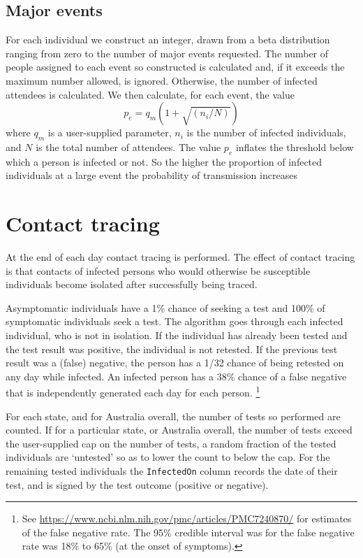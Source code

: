 \documentclass[submission]{grattan}
\newcommand*{\code}[1]{\texttt{#1}}
\begin{document}
\subsection{Major events}
For each individual we construct an integer, drawn from a beta distribution ranging from zero
to the number of major events requested. The number of people assigned to each event so constructed
is calculated and, if it exceeds the maximum number allowed, is ignored. Otherwise, the number of
infected attendees is calculated. We then calculate, for each event, the value
\[p_e = q_m(1 + \sqrt{(n_i / N)}) \]
where \(q_m\) is a user-supplied parameter, \(n_i\) is the number of infected individuals, and \(N\)
is the total number of attendees. The value \(p_e\) inflates the threshold below which a person is infected
or not. So the higher the proportion of infected individuals at a large event the probability of 
transmission increases 

\section{Contact tracing}
At the end of each day contact tracing is performed. 
The effect of contact tracing is that contacts of infected
persons who would otherwise be susceptible 
individuals become isolated after successfully being traced.

Asymptomatic individuals have a 1\% chance of seeking a test and 
100\% of symptomatic individuals seek a test. The algorithm goes
through each infected individual, who is not in isolation. If the individual has already 
been tested and the test result was positive, the individual is not
retested. If the previous test result was a (false) negative, the person
has a 1/32 chance of being retested on any day while infected. 
An infected person has a  38\% chance
of a false negative that is independently generated each day for each person.%
	\footnote{See \url{https://www.ncbi.nlm.nih.gov/pmc/articles/PMC7240870/} for 
	estimates of the false negative rate. The 95\% credible interval was for the false
	negative rate was 18\% to
	65\% (at the onset of symptoms).}

For each state, and for Australia overall, the number of tests so performed
are counted. If for a particular state, or Australia overall,
the number of tests exceed the user-supplied cap on the number
of tests, a random fraction of the tested individuals are `untested' 
so as to lower the count to below the cap. For the remaining tested individuals
the \code{InfectedOn} column records the date of their test, and is signed
by the test outcome (positive or negative).
\end{document}
